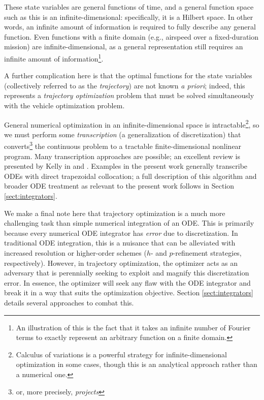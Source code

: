 These state variables are general functions of time, and a general function space such as this is an infinite-dimensional: specifically, it is a Hilbert space. In other words, an infinite amount of information is required to fully describe any general function. Even functions with a finite domain (e.g., airspeed over a fixed-duration mission) are infinite-dimensional, as a general representation still requires an infinite amount of information\footnote{An illustration of this is the fact that it takes an infinite number of Fourier terms to exactly represent an arbitrary function on a finite domain.}.

A further complication here is that the optimal functions for the state variables (collectively referred to as the \textit{trajectory}) are not known \textit{a priori}; indeed, this represents a \textit{trajectory optimization} problem that must be solved simultaneously with the vehicle optimization problem.

General numerical optimization in an infinite-dimensional space is intractable\footnote{Calculus of variations is a powerful strategy for infinite-dimensional optimization in some cases, though this is an analytical approach rather than a numerical one.}, so we must perform some \textit{transcription} (a generalization of discretization) that converts\footnote{or, more precisely, \textit{projects}} the continuous problem to a tractable finite-dimensional nonlinear program. Many transcription approaches are possible; an excellent review is presented by Kelly in \cite{mpk2015} and \cite{mpk2017}. Examples in the present work generally transcribe ODEs with direct trapezoidal collocation; a full description of this algorithm and broader ODE treatment as relevant to the present work follows in Section \ref{sect:integrators}.

We make a final note here that trajectory optimization is a much more challenging task than simple numerical integration of an ODE. This is primarily because every numerical ODE integrator has \textit{error} due to discretization. In traditional ODE integration, this is a nuisance that can be alleviated with increased resolution or higher-order schemes ($h$- and $p$-refinement strategies, respectively). However, in trajectory optimization, the optimizer acts as an adversary that is perennially seeking to exploit and magnify this discretization error. In essence, the optimizer will seek any flaw with the ODE integrator and break it in a way that suits the optimization objective. Section \ref{sect:integrators} details several approaches to combat this.

